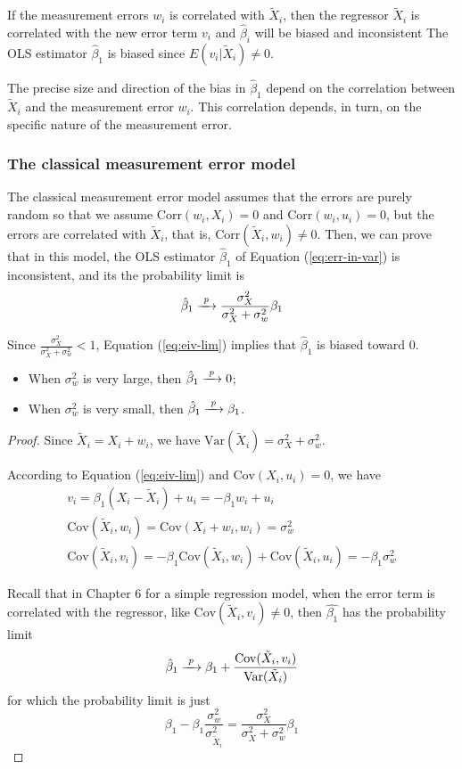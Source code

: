 \documentclass[a4paper,11pt]{article}
\newcommand{\var}{\mathrm{Var}}
\newcommand{\cov}{\mathrm{Cov}}
\newcommand{\corr}{\mathrm{Corr}}
\newcommand{\rarrowd}[1]{\xrightarrow{\text{ \textit #1 }}}
\begin{document}
If the measurement errors \(w_i\) is correlated with \(\tilde{X}_i\), then
the regressor \(\tilde{X}_i\) is correlated with the new error term
\(v_i\) and \(\hat{\beta}_i\) will be biased and inconsistent
The OLS estimator \(\hat{\beta}_1\) is biased since \(E(v_i |
\tilde{X}_i) \neq 0\). 

The precise size and direction of the bias in \(\hat{\beta}_1\) depend
on the correlation between \(\tilde{X}_i\) and the measurement error
\(w_i\). This correlation depends, in turn, on the specific nature of
the measurement error. 

\subsubsection*{The classical measurement error model}
\label{sec:org45d486a}
The classical measurement error model assumes that the errors are
purely random so that we assume \(\corr(w_i, X_i) = 0\) and \(\corr(w_i,
u_i) = 0\), but the errors are correlated with \(\tilde{X}_i\), that is,
\(\corr(\tilde{X}_i, w_i) \neq 0\). Then, we can prove that in this
model, the OLS estimator \(\hat{\beta}_1\) of Equation
(\ref{eq:err-in-var}) is inconsistent, and its the probability limit
is
\begin{equation}
\label{eq:eiv-lim}
\hat{\beta}_1 \rarrowd{p} \frac{\sigma^2_X}{\sigma^2_X + \sigma^2_w}\beta_1
\end{equation}

Since \(\frac{\sigma^2_X}{\sigma^2_X + \sigma^2_w} < 1\), Equation
(\ref{eq:eiv-lim}) implies that
\(\hat{\beta}_1\) is biased toward 0.
\begin{itemize}
\item When \(\sigma^2_w\) is very large, then \(\hat{\beta}_1 \rarrowd{p} 0\);
\item When \(\sigma^2_w\) is very small, then \(\hat{\beta}_1 \rarrowd{p} \beta_1\).
\end{itemize}

\begin{proof}
Since $\tilde{X}_i = X_i + w_i$, we have $\var(\tilde{X}_i) = \sigma^2_{X} + \sigma^2_w$. 

According to Equation (\ref{eq:eiv-lim}) and $\cov(X_i, u_i) = 0$, we have
\begin{gather*}
v_i = \beta_1 (X_i - \tilde{X}_i) + u_i = -\beta_1 w_i + u_i \\
\cov(\tilde{X}_i, w_i) = \cov(X_i + w_i, w_i) = \sigma^2_w \\
\cov(\tilde{X}_i, v_i) = -\beta_1 \cov(\tilde{X}_i, w_i) + \cov(\tilde{X}_i, u_i) = -\beta_1 \sigma^2_w
\end{gather*}

Recall that in Chapter 6 for a simple regression model, when the error term is correlated with the regressor,
like $\cov(\tilde{X}_i, v_i) \neq 0$, then $\hat{\beta_1}$ has the probability limit
\[\hat{\beta}_1 \rarrowd{p} \beta_1 + \frac{\cov(\tilde{X}_i, v_i)}{\var(\tilde{X}_i)} \]
for which the probability limit is just
\[ \beta_1 - \beta_1 \frac{\sigma^2_w}{\sigma^2_{\tilde{X}_i}} = \frac{\sigma^2_X}{\sigma^2_X + \sigma^2_w}\beta_1 \]
\end{proof}
\end{document}
